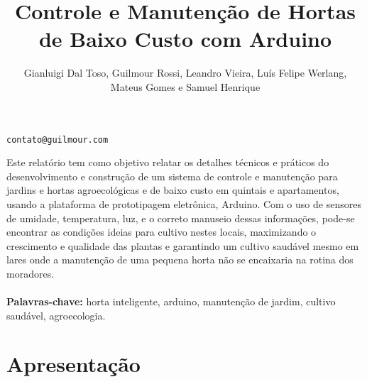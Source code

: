 \documentclass[12pt]{article}
\title{Controle e Manutenção de Hortas de Baixo Custo com Arduino}
\author{Gianluigi Dal Toso, Guilmour Rossi, Leandro Vieira, Luís Felipe Werlang, \\Mateus Gomes e Samuel Henrique}
\begin{document}
 


\maketitle
\begin{center}
\texttt{contato@guilmour.com}
\end{center}

%
     
\begin{resumo} 
  Este relatório tem como objetivo relatar os detalhes técnicos e práticos do desenvolvimento e construção de um sistema de controle e manutenção para jardins e hortas agroecológicas e de baixo custo em quintais e apartamentos, usando a plataforma de prototipagem eletrônica, Arduino. Com o uso de sensores de umidade, temperatura, luz, e o correto manuseio dessas informações, pode-se encontrar as condições ideias para cultivo nestes locais, maximizando o crescimento e qualidade das plantas e garantindo um cultivo saudável mesmo em lares onde a manutenção de uma pequena horta não se encaixaria na rotina dos moradores.
  \textbf{\\\\Palavras-chave:} horta inteligente, arduino, manutenção de jardim, cultivo saudável, agroecologia.
\end{resumo}




\section{Apresentação}











\end{document}
